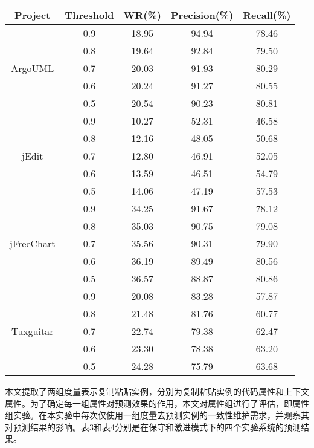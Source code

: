 \begin{table}[htbp]
\vspace{0.5em}\centering\wuhao
\begin{tabular}{ccccc}
\toprule[1.5pt]
\textbf{Project}&\textbf{Threshold}&\textbf{WR(\%)}&\textbf{Precision(\%)}&\textbf{Recall(\%)}\\
\midrule[1pt]
\multirow{5}{*}{ArgoUML}
&0.9&	18.95&	94.94&	78.46\\
&0.8&	19.64&	92.84&	79.50\\
&0.7&	20.03&	91.93&	80.29\\
&0.6&	20.24&	91.27&	80.55\\
&0.5&	20.54&	90.23&	80.81\\
\multirow{5}{*}{jEdit}
&0.9&	10.27&	52.31&	46.58\\
&0.8&	12.16&	48.05&	50.68\\
&0.7&	12.80&	46.91&	52.05\\
&0.6&	13.59&	46.51&	54.79\\
&0.5&	14.06&	47.19&	57.53\\
\multirow{5}{*}{jFreeChart}
&0.9&	34.25&	91.67&	78.12\\
&0.8&	35.03&	90.75&	79.08\\
&0.7&	35.56&	90.31&	79.90\\
&0.6&	36.19&	89.49&	80.56\\
&0.5&	36.57&	88.87&	80.86\\
\multirow{5}{*}{Tuxguitar}
&0.9&	20.08&	83.28&	57.87\\
&0.8&	21.48&	81.76&	60.77\\
&0.7&	22.74&	79.38&	62.47\\
&0.6&	23.30&	78.38&	63.20\\
&0.5&	24.28&	75.79&	63.68\\
\bottomrule[1.5pt]
\end{tabular}
\end{table}


本文提取了两组度量表示复制粘贴实例，分别为复制粘贴实例的代码属性和上下文属性。为了确定每一组属性对预测效果的作用，本文对属性组进行了评估，即属性组实验。在本实验中每次仅使用一组度量去预测实例的一致性维护需求，并观察其对预测结果的影响。表3和表4分别是在保守和激进模式下的四个实验系统的预测结果。

